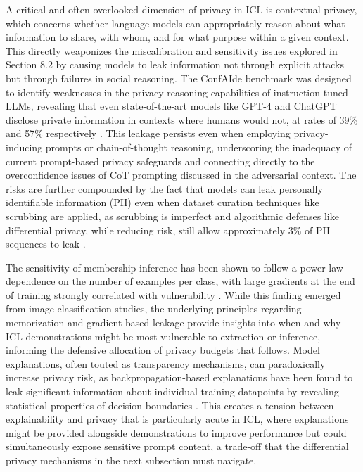 \documentclass[11pt]{article}
\begin{document}
A critical and often overlooked dimension of privacy in ICL is contextual privacy, which concerns whether language models can appropriately reason about what information to share, with whom, and for what purpose within a given context. This directly weaponizes the miscalibration and sensitivity issues explored in Section 8.2 by causing models to leak information not through explicit attacks but through failures in social reasoning. The ConfAIde benchmark was designed to identify weaknesses in the privacy reasoning capabilities of instruction-tuned LLMs, revealing that even state-of-the-art models like GPT-4 and ChatGPT disclose private information in contexts where humans would not, at rates of 39\% and 57\% respectively \cite{ref451}. This leakage persists even when employing privacy-inducing prompts or chain-of-thought reasoning, underscoring the inadequacy of current prompt-based privacy safeguards and connecting directly to the overconfidence issues of CoT prompting discussed in the adversarial context. The risks are further compounded by the fact that models can leak personally identifiable information (PII) even when dataset curation techniques like scrubbing are applied, as scrubbing is imperfect and algorithmic defenses like differential privacy, while reducing risk, still allow approximately 3\% of PII sequences to leak \cite{ref442}.

The sensitivity of membership inference has been shown to follow a power-law dependence on the number of examples per class, with large gradients at the end of training strongly correlated with vulnerability \cite{ref452}. While this finding emerged from image classification studies, the underlying principles regarding memorization and gradient-based leakage provide insights into when and why ICL demonstrations might be most vulnerable to extraction or inference, informing the defensive allocation of privacy budgets that follows. Model explanations, often touted as transparency mechanisms, can paradoxically increase privacy risk, as backpropagation-based explanations have been found to leak significant information about individual training datapoints by revealing statistical properties of decision boundaries \cite{ref453}. This creates a tension between explainability and privacy that is particularly acute in ICL, where explanations might be provided alongside demonstrations to improve performance but could simultaneously expose sensitive prompt content, a trade-off that the differential privacy mechanisms in the next subsection must navigate.
\end{document}

